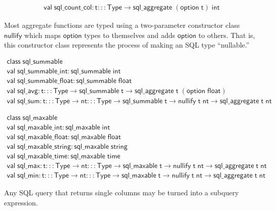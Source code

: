 \documentclass{article}
\newcommand{\mt}[1]{\mathsf{#1}}
\begin{document}
$$\begin{array}{l}
  \mt{val} \; \mt{sql\_count\_col} : \mt{t} ::: \mt{Type} \to \mt{sql\_aggregate} \; (\mt{option} \; \mt{t}) \; \mt{int}
\end{array}$$

Most aggregate functions are typed using a two-parameter constructor class $\mt{nullify}$ which maps $\mt{option}$ types to themselves and adds $\mt{option}$ to others.  That is, this constructor class represents the process of making an SQL type ``nullable.''
 
$$\begin{array}{l}
  \mt{class} \; \mt{sql\_summable} \\
  \mt{val} \; \mt{sql\_summable\_int} : \mt{sql\_summable} \; \mt{int} \\
  \mt{val} \; \mt{sql\_summable\_float} : \mt{sql\_summable} \; \mt{float} \\
  \mt{val} \; \mt{sql\_avg} : \mt{t} ::: \mt{Type} \to \mt{sql\_summable} \; \mt{t} \to \mt{sql\_aggregate} \; \mt{t} \; (\mt{option} \; \mt{float}) \\
  \mt{val} \; \mt{sql\_sum} : \mt{t} ::: \mt{Type} \to \mt{nt} ::: \mt{Type} \to \mt{sql\_summable} \; \mt{t} \to \mt{nullify} \; \mt{t} \; \mt{nt} \to \mt{sql\_aggregate} \; \mt{t} \; \mt{nt}
\end{array}$$

$$\begin{array}{l}
  \mt{class} \; \mt{sql\_maxable} \\
  \mt{val} \; \mt{sql\_maxable\_int} : \mt{sql\_maxable} \; \mt{int} \\
  \mt{val} \; \mt{sql\_maxable\_float} : \mt{sql\_maxable} \; \mt{float} \\
  \mt{val} \; \mt{sql\_maxable\_string} : \mt{sql\_maxable} \; \mt{string} \\
  \mt{val} \; \mt{sql\_maxable\_time} : \mt{sql\_maxable} \; \mt{time} \\
  \mt{val} \; \mt{sql\_max} : \mt{t} ::: \mt{Type} \to \mt{nt} ::: \mt{Type} \to \mt{sql\_maxable} \; \mt{t} \to \mt{nullify} \; \mt{t} \; \mt{nt} \to \mt{sql\_aggregate} \; \mt{t} \; \mt{nt} \\
  \mt{val} \; \mt{sql\_min} : \mt{t} ::: \mt{Type} \to \mt{nt} ::: \mt{Type} \to \mt{sql\_maxable} \; \mt{t} \to \mt{nullify} \; \mt{t} \; \mt{nt} \to \mt{sql\_aggregate} \; \mt{t} \; \mt{nt}
\end{array}$$

Any SQL query that returns single columns may be turned into a subquery expression.
\end{document}
